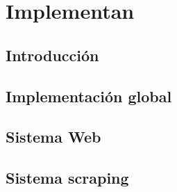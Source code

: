 \section{Implementan}

\subsection{Introducción}
 
\subsection{Implementación global}

\subsection{Sistema Web}

\subsection{Sistema scraping}

\newpage



